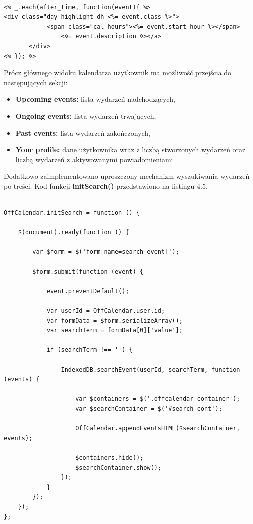 \begin{lstlisting}[caption=Fragment kodu prezentujący składnię Underscore.js., label=amb, captionpos=b]

<% _.each(after_time, function(event){ %>
<div class="day-highlight dh-<%= event.class %>">
       		<span class="cal-hours"><%= event.start_hour %></span>
              	<%= event.description %></a>
       </div>
<% }); %>

\end{lstlisting}

Prócz głównego widoku kalendarza użytkownik ma możliwość przejścia do następujących sekcji:

\begin{itemize}
\item \textbf{Upcoming events:} lista wydarzeń nadchodzących,
\item \textbf{Ongoing events:} lista wydarzeń trwających,
\item \textbf{Past events:} lista wydarzeń zakończonych,
\item \textbf{Your profile:} dane użytkownika wraz z liczbą stworzonych wydarzeń oraz liczbą wydarzeń z aktywowanymi powiadomieniami.
\end{itemize}

Dodatkowo zaimplementowano uproszczony mechanizm wyszukiwania wydarzeń po treści. Kod funkcji \textbf{initSearch()} przedstawiono na listingu 4.5.

\begin{lstlisting}[caption=Wyszukiwanie wydarzeń w oparciu o treść., label=amb, captionpos=b]

OffCalendar.initSearch = function () {

    $(document).ready(function () {
    
        var $form = $('form[name=search_event]');

        $form.submit(function (event) {

            event.preventDefault();

            var userId = OffCalendar.user.id;
            var formData = $form.serializeArray();
            var searchTerm = formData[0]['value'];

            if (searchTerm !== '') {

                IndexedDB.searchEvent(userId, searchTerm, function (events) {

                    var $containers = $('.offcalendar-container');
                    var $searchContainer = $('#search-cont');

                    OffCalendar.appendEventsHTML($searchContainer, events);

                    $containers.hide();
                    $searchContainer.show();
                });
            }
        });
    });
};

\end{lstlisting}

